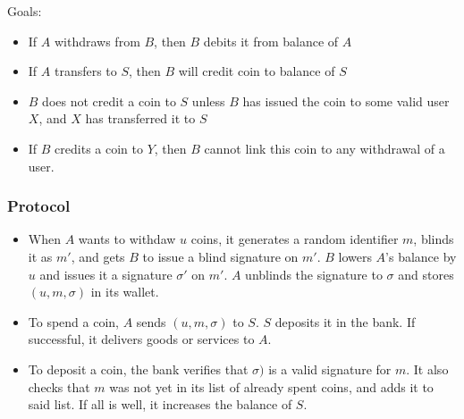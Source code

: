 Goals:
\begin{itemize}
		\item If $A$ withdraws from $B$, then $B$ debits it from balance of $A$
		\item If $A$ transfers to $S$, then $B$ will credit coin to balance of $S$
		\item $B$ does not credit a coin to $S$ unless $B$ has issued the coin
				to some valid user $X$, and $X$ has transferred it to $S$
		\item If $B$ credits a coin to $Y$, then $B$ cannot link this coin to
				any withdrawal of a user.
\end{itemize}

\subsubsection{Protocol}

\begin{itemize}
		\item When $A$ wants to withdaw $u$ coins, it generates a random
				identifier $m$, blinds it as $m'$, and gets $B$ to issue a
				blind signature on $m'$. $B$ lowers $A$'s balance by $u$ and
				issues it a signature $\sigma'$ on $m'$. $A$ unblinds the
				signature to $\sigma$ and stores $(u, m, \sigma)$ in its
				wallet.
		\item To spend a coin, $A$ sends $(u, m, \sigma)$ to $S$. $S$ deposits
				it in the bank. If successful, it delivers goods or services to
				$A$.
		\item To deposit a coin, the bank verifies that $\sigma)$ is a valid
				signature for $m$. It also checks that $m$ was not yet in its
				list of already spent coins, and adds it to said list. If all
				is well, it increases the balance of $S$.
\end{itemize}
